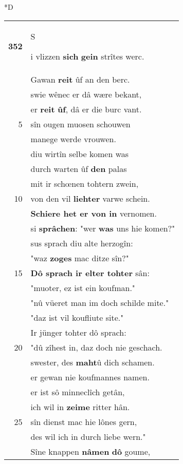 \documentclass[8pt,a4paper,notitlepage]{article}
\begin{document}
\begin{table}[ht]
\begin{minipage}[t]{0.5\linewidth}
\small
\begin{center}*D
\end{center}
\begin{tabular}{rl}
\textbf{352} & \begin{large}S\end{large}i vlizzen \textbf{sich} \textbf{gein} strîtes werc.\\ 
 & Gawan \textbf{reit} ûf an den berc.\\ 
 & swie wênec er dâ wære bekant,\\ 
 & er \textbf{reit} \textbf{ûf}, dâ er die burc vant.\\ 
5 & sîn ougen muosen schouwen\\ 
 & manege werde vrouwen.\\ 
 & diu wirtîn selbe komen was\\ 
 & durch warten ûf \textbf{den} palas\\ 
 & mit ir schœnen tohtern zwein,\\ 
10 & von den vil \textbf{liehter} varwe schein.\\ 
 & \textbf{Schiere het er von in} vernomen.\\ 
 & si \textbf{sprâchen}: "wer \textbf{was} uns hie komen?"\\ 
 & sus sprach diu alte herzogîn:\\ 
 & "waz \textbf{zoges} mac ditze sîn?"\\ 
15 & \textbf{Dô sprach ir elter tohter} sân:\\ 
 & "muoter, ez ist ein koufman."\\ 
 & "nû vüeret man im doch schilde mite."\\ 
 & "daz ist vil koufliute site."\\ 
 & Ir jünger tohter dô sprach:\\ 
20 & "dû zîhest in, daz doch nie geschach.\\ 
 & swester, des \textbf{maht}û dich schamen.\\ 
 & er gewan nie koufmannes namen.\\ 
 & er ist sô minneclîch getân,\\ 
 & ich wil in \textbf{zeime} ritter hân.\\ 
25 & sîn dienst mac hie lônes gern,\\ 
 & des wil ich in durch liebe wern."\\ 
 & Sîne knappen \textbf{nâmen} \textbf{dô} goume,\\ 

\end{tabular}
\end{minipage}
\end{table}
\end{document}
